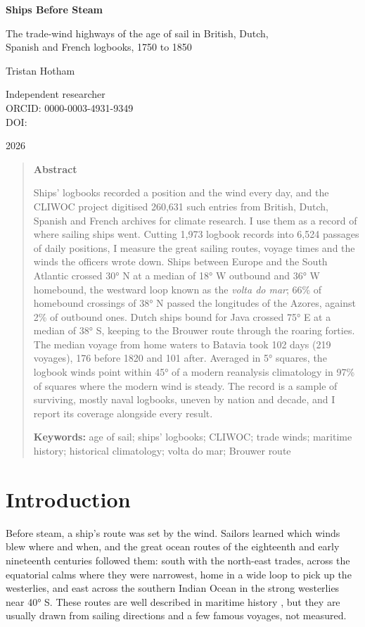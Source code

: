 \documentclass[11pt,a4paper]{article}
\begin{document}
\begin{center}
{\Large\bfseries Ships Before Steam\par}
\vspace{0.4em}
{\large The trade-wind highways of the age of sail in British, Dutch,\\Spanish and French logbooks, 1750 to 1850\par}
\vspace{1.2em}
{\large Tristan Hotham\par}
\vspace{0.3em}
{\small Independent researcher\\
ORCID: 0000-0003-4931-9349\\
DOI: \par}
\vspace{0.8em}
2026
\end{center}

\begin{quote}
\small
\begin{center}\textbf{Abstract}\end{center}
Ships' logbooks recorded a position and the wind every day, and the CLIWOC project digitised 260,631 such entries from British, Dutch, Spanish and French archives for climate research. I use them as a record of where sailing ships went. Cutting 1,973 logbook records into 6,524 passages of daily positions, I measure the great sailing routes, voyage times and the winds the officers wrote down. Ships between Europe and the South Atlantic crossed 30° N at a median of 18° W outbound and 36° W homebound, the westward loop known as the \emph{volta do mar}; 66\% of homebound crossings of 38° N passed the longitudes of the Azores, against 2\% of outbound ones. Dutch ships bound for Java crossed 75° E at a median of 38° S, keeping to the Brouwer route through the roaring forties. The median voyage from home waters to Batavia took 102 days (219 voyages), 176 before 1820 and 101 after. Averaged in 5° squares, the logbook winds point within 45° of a modern reanalysis climatology in 97\% of squares where the modern wind is steady. The record is a sample of surviving, mostly naval logbooks, uneven by nation and decade, and I report its coverage alongside every result.

\textbf{Keywords:} age of sail; ships' logbooks; CLIWOC; trade winds; maritime history; historical climatology; volta do mar; Brouwer route
\end{quote}

\section{Introduction}
Before steam, a ship's route was set by the wind. Sailors learned which winds blew where and when, and the great ocean routes of the eighteenth and early nineteenth centuries followed them: south with the north-east trades, across the equatorial calms where they were narrowest, home in a wide loop to pick up the westerlies, and east across the southern Indian Ocean in the strong westerlies near 40° S. These routes are well described in maritime history \citep{bruijn1987}, but they are usually drawn from sailing directions and a few famous voyages, not measured.
\end{document}
